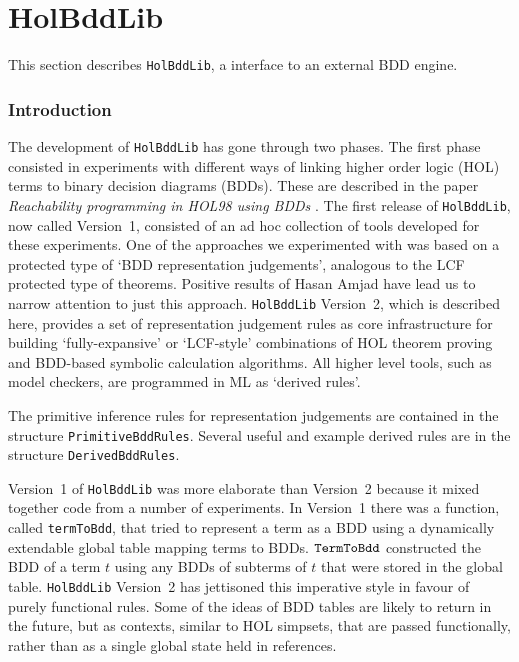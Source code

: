 \documentclass[12pt]{book}
\renewcommand{\t}[1]{\mbox{\tt #1}}
\begin{document}
\chapter{HolBddLib}

This section describes {\tt HolBddLib}, a \HOL{} interface to an external BDD engine.

\subsection{Introduction}

The development of {\tt HolBddLib} has gone through two phases.  The
first phase consisted in experiments with different ways of linking
higher order logic (HOL) terms to binary decision diagrams (BDDs).
These are described in the paper {\it Reachability programming in HOL98 using BDDs\/} \cite{tphols2000-Gordon}. The first release of
\t{HolBddLib}, now called Version~1, consisted of an ad hoc collection
of tools developed for these experiments.  One of the approaches we
experimented with was based on a protected type of `BDD representation
judgements', analogous to the LCF protected type of theorems.
Positive results of Hasan Amjad \cite{Amjad:TPHOLs2001} have lead us
to narrow attention to just this approach. \t{HolBddLib} Version~2,
which is described here, provides a set of representation judgement
rules as core infrastructure for building `fully-expansive' or
`LCF-style' combinations of HOL theorem proving and BDD-based symbolic
calculation algorithms. All higher level tools, such as model
checkers, are programmed in ML as `derived rules'.

The primitive inference rules for representation judgements are contained in the structure
{\tt{PrimitiveBddRules}}. Several useful and example  derived rules are in the
structure {\tt{DerivedBddRules}}. 

Version~1 of {\tt{HolBddLib}} was more elaborate than Version~2
because it mixed together code from a number of experiments.
In Version~1 there was a function, called
{\texttt{termToBdd}}, that tried to represent a \HOL{} term as a BDD
using a dynamically extendable global table mapping \HOL{} terms to
BDDs.  $\t{TermToBdd}$ constructed the BDD of a term $t$ using any
BDDs of subterms of $t$ that were stored in the global table.
{\tt{HolBddLib}} Version~2 has jettisoned this imperative style
in favour of purely functional rules. Some of
the ideas of BDD tables are likely to return in the future, but as
contexts, similar to HOL simpsets, that are passed functionally,
rather than as a single global state held in references.
\end{document}
